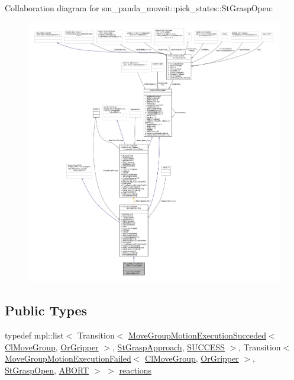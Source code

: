 Collaboration diagram for sm\+\_\+panda\+\_\+moveit\+:\+:pick\+\_\+states\+:\+:St\+Grasp\+Open\+:
\nopagebreak
\begin{figure}[H]
\begin{center}
\leavevmode
\includegraphics[width=350pt]{structsm__panda__moveit_1_1pick__states_1_1StGraspOpen__coll__graph}
\end{center}
\end{figure}
\subsection*{Public Types}
\begin{DoxyCompactItemize}
\item 
typedef mpl\+::list$<$ Transition$<$ \hyperlink{structmoveit__z__client_1_1MoveGroupMotionExecutionSucceded}{Move\+Group\+Motion\+Execution\+Succeded}$<$ \hyperlink{classmoveit__z__client_1_1ClMoveGroup}{Cl\+Move\+Group}, \hyperlink{classsm__panda__moveit_1_1OrGripper}{Or\+Gripper} $>$, \hyperlink{structsm__panda__moveit_1_1pick__states_1_1StGraspApproach}{St\+Grasp\+Approach}, \hyperlink{classSUCCESS}{S\+U\+C\+C\+E\+SS} $>$, Transition$<$ \hyperlink{structmoveit__z__client_1_1MoveGroupMotionExecutionFailed}{Move\+Group\+Motion\+Execution\+Failed}$<$ \hyperlink{classmoveit__z__client_1_1ClMoveGroup}{Cl\+Move\+Group}, \hyperlink{classsm__panda__moveit_1_1OrGripper}{Or\+Gripper} $>$, \hyperlink{structsm__panda__moveit_1_1pick__states_1_1StGraspOpen}{St\+Grasp\+Open}, \hyperlink{classABORT}{A\+B\+O\+RT} $>$ $>$ \hyperlink{structsm__panda__moveit_1_1pick__states_1_1StGraspOpen_a02a356537b3f5259fe38bbeed6c6682b}{reactions}
\end{DoxyCompactItemize}
